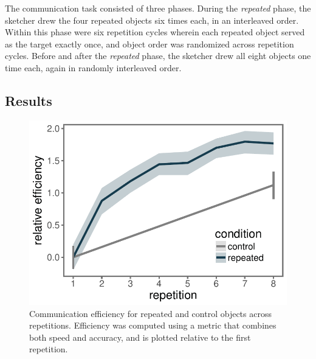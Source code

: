 \documentclass[10pt,letterpaper]{article}
\begin{document}

The communication task consisted of three phases. 
During the \textit{repeated} phase, the sketcher drew the four repeated objects six times each, in an interleaved order.
Within this phase were six repetition cycles wherein each repeated object served as the target exactly once, and object order was randomized across repetition cycles. 
Before and after the \textit{repeated} phase, the sketcher drew all eight objects one time each, again in randomly interleaved order. 


\subsection{Results}

\begin{figure}
\includegraphics[width=\linewidth]{figures/refgame_BIS_timeseries.pdf}
\caption{Communication efficiency for repeated and control objects across repetitions. Efficiency was computed using a metric that combines both speed and accuracy, and is plotted relative to the first repetition.} \label{refgame_bis}
\end{figure}
\end{document}

